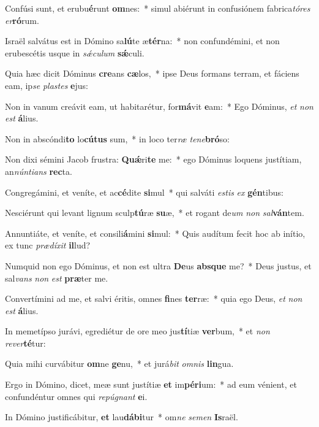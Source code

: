 \item Confúsi sunt, et erubu\textbf{é}runt \textbf{om}nes:~* simul abiérunt in confusiónem fabrica\textit{tó}\textit{res} \textit{er}\textbf{ró}rum.
\item Israël salvátus est in Dómino sa\textbf{lú}te æ\textbf{tér}na:~* non confundémini, et non erubescétis usque in \textit{sǽ}\textit{cu}\textit{lum} \textbf{sǽ}culi.
\item Quia hæc dicit Dóminus \textbf{cre}ans \textbf{cæ}los,~* ipse Deus formans terram, et fáciens eam, ip\textit{se} \textit{plas}\textit{tes} \textbf{e}jus:
\item Non in vanum creávit eam, ut habitarétur, for\textbf{má}vit \textbf{e}am:~* Ego Dóminus, \textit{et} \textit{non} \textit{est} \textbf{á}lius.
\item Non in abscóndi\textbf{to} lo\textbf{cú}\textbf{tus} sum,~* in loco ter\textit{ræ} \textit{te}\textit{ne}\textbf{bró}so:
\item Non dixi sémini Jacob frustra: \textbf{Quǽ}ri\textbf{te} me:~* ego Dóminus loquens justítiam, an\textit{nún}\textit{ti}\textit{ans} \textbf{rec}ta.
\item Congregámini, et veníte, et ac\textbf{cé}dite \textbf{si}mul~* qui salváti \textit{es}\textit{tis} \textit{ex} \textbf{gén}tibus:
\item Nesciérunt qui levant lignum sculp\textbf{tú}ræ \textbf{su}æ,~* et rogant de\textit{um} \textit{non} \textit{sal}\textbf{ván}tem.
\item Annuntiáte, et veníte, et consili\textbf{á}mini \textbf{si}mul:~* Quis audítum fecit hoc ab inítio, ex tunc \textit{præ}\textit{dí}\textit{xit} \textbf{il}lud?
\item Numquid non ego Dóminus, et non est ultra \textbf{De}us \textbf{abs}\textbf{que} me?~* Deus justus, et sal\textit{vans} \textit{non} \textit{est} \textbf{præ}ter me.
\item Convertímini ad me, et salvi éritis, omnes \textbf{fi}nes \textbf{ter}ræ:~* quia ego Deus, \textit{et} \textit{non} \textit{est} \textbf{á}lius.
\item In memetípso jurávi, egrediétur de ore meo jus\textbf{tí}tiæ \textbf{ver}bum,~* et \textit{non} \textit{re}\textit{ver}\textbf{té}tur:
\item Quia mihi curvábitur \textbf{om}ne \textbf{ge}nu,~* et jurá\textit{bit} \textit{om}\textit{nis} \textbf{lin}gua.
\item Ergo in Dómino, dicet, meæ sunt justítiæ \textbf{et} im\textbf{pé}\textbf{ri}um:~* ad eum vénient, et confundéntur omnes qui \textit{re}\textit{pú}\textit{gnant} \textbf{e}i.
\item In Dómino justificábitur, \textbf{et} lau\textbf{dá}\textbf{bi}tur~* om\textit{ne} \textit{se}\textit{men} \textbf{Is}raël.
